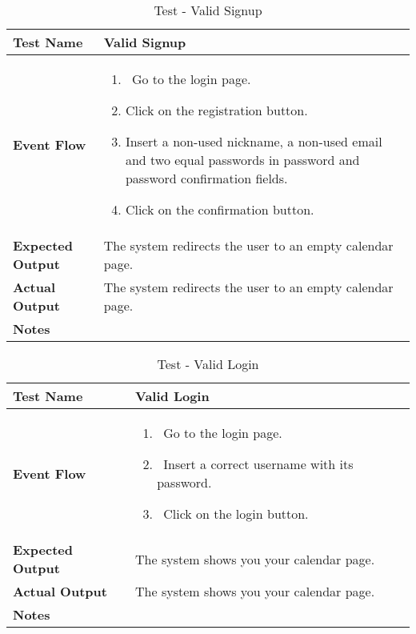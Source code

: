 \begin{table}[h]	
	\centering
	\def\arraystretch{1.5}
	\begin{tabular}{|m{7cm}|m{7cm}|}
		\hline
		\textbf{Test Name}            &  Valid Signup  \\ \hline
		\textbf{Event Flow}             &  
		\begin{enumerate}
			\item~Go to the login page.
			\item Click on the registration button.
			\item Insert a non-used nickname, a non-used email and two equal passwords in password and password confirmation fields.
			\item Click on the confirmation button.
		\end{enumerate} \\ \hline
		\textbf{Expected Output}  &  The system redirects the user to an empty calendar page.   \\ \hline
		\textbf{Actual Output}       & The system redirects the user to an empty calendar page.    \\ \hline
		\textbf{Notes} & \\ \hline
	\end{tabular}
	\caption{Test - Valid Signup}
\end{table}


\begin{table}[h]	
	\centering
	\def\arraystretch{1.5}
	\begin{tabular}{|m{7cm}|m{7cm}|}
		\hline
		\textbf{Test Name}            &  Valid Login  \\ \hline
		\textbf{Event Flow}             &  
		\begin{enumerate}
			\item~Go to the login page.
			\item~Insert a correct username with its password.
			\item~Click on the login button.
		\end{enumerate}
		\\ \hline
		\textbf{Expected Output}  &  The system shows you your calendar page.   \\ \hline
		\textbf{Actual Output}       &  The system shows you your calendar page.   \\ \hline
		\textbf{Notes} & \\ \hline
	\end{tabular}
	\caption{Test - Valid Login}
\end{table}


